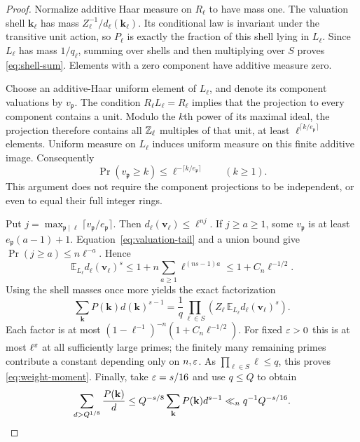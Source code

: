 \begin{proof}
Normalize additive Haar measure on $R_\ell$ to have mass one.
The valuation shell $\mathbf k_\ell$ has mass
$Z_\ell^{-1}/d_\ell(\mathbf k_\ell)$. Its conditional law is
invariant under the transitive unit action, so $P_\ell$ is
exactly the fraction of this shell lying in $L_\ell$.
Since $L_\ell$ has mass $1/q_\ell$, summing over shells and
then multiplying over $S$ proves \eqref{eq:shell-sum}.
Elements with a zero component have additive measure zero.

Choose an additive-Haar uniform element of $L_\ell$, and denote
its component valuations by $v_{\mathfrak p}$. The condition
$R_\ell L_\ell=R_\ell$ implies that the projection to every
component contains a unit. Modulo the $k$th power of its maximal
ideal, the projection therefore contains all $\mathbb Z_\ell$ multiples
of that unit, at least $\ell^{\lceil k/e_{\mathfrak p}\rceil}$
elements. Uniform measure on $L_\ell$ induces uniform measure
on this finite additive image. Consequently
\begin{equation}\label{eq:valuation-tail}
 \Pr(v_{\mathfrak p}\ge k)
       \le\ell^{-\lceil k/e_{\mathfrak p}\rceil}\qquad(k\ge1).
\end{equation}
This argument does not require the component projections to be
independent, or even to equal their full integer rings.

Put $j=\max_{\mathfrak p\mid\ell}
\lceil v_{\mathfrak p}/e_{\mathfrak p}\rceil$. Then
$d_\ell(\mathbf v_\ell)\le\ell^{nj}$. If $j\ge a\ge1$, some
$v_{\mathfrak p}$ is at least $e_{\mathfrak p}(a-1)+1$.
Equation~\eqref{eq:valuation-tail} and a union bound give
$\Pr(j\ge a)\le n\ell^{-a}$. Hence
\begin{equation}\label{eq:local-moment}
 \mathbb E_{L_\ell}d_\ell(\mathbf v_\ell)^s
 \le1+n\sum_{a\ge1}\ell^{(ns-1)a}
 \le1+C_n\ell^{-1/2}.
\end{equation}
Using the shell masses once more yields the exact factorization
\[
 \sum_{\mathbf k}P(\mathbf k)d(\mathbf k)^{s-1}
   =\frac1q\prod_{\ell\in S}
       \left(Z_\ell\,\mathbb E_{L_\ell}d_\ell(\mathbf v_\ell)^s\right).
\]
Each factor is at most
$(1-\ell^{-1})^{-n}(1+C_n\ell^{-1/2})$. For fixed $\varepsilon>0$
this is at most $\ell^\varepsilon$ at all sufficiently large primes;
the finitely many remaining primes contribute a constant
depending only on $n,\varepsilon$. As $\prod_{\ell\in S}\ell\le q$,
this proves \eqref{eq:weight-moment}. Finally, take
$\varepsilon=s/16$ and use $q\le Q$ to obtain
\[
 \sum_{d>Q^{1/8}}\frac{P(\mathbf k)}d
 \le Q^{-s/8}\sum_{\mathbf k}P(\mathbf k)d^{s-1}
 \ll_n q^{-1}Q^{-s/16}.
 \qedhere
\]
\end{proof}
